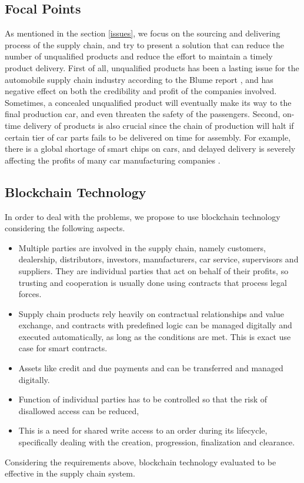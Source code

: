 \documentclass[12pt]{article}
\begin{document}
\subsection{Focal Points}
As mentioned in the section \ref{issues}, we focus on the sourcing and delivering process of the supply chain, 
and try to present a solution that can reduce the number of unqualified products and reduce the effort to maintain 
a timely product delivery. First of all, unqualified products has been a lasting issue for the automobile supply 
chain industry according to the Blume report \cite{blume}, and has negative effect on both the credibility and 
profit of the companies involved. Sometimes, a concealed unqualified product will eventually make its way to the 
final production car, and even threaten the safety of the passengers. Second, on-time delivery of products is also 
crucial since the chain of production will halt if certain tier of car parts fails to be delivered on time for assembly. 
For example, there is a global shortage of smart chips on cars, and delayed delivery is severely affecting the profits of 
many car manufacturing companies \cite{shortage}.

\subsection{Blockchain Technology}
In order to deal with the problems, we propose to use blockchain technology considering the following aspects.
\begin{itemize}
    \item Multiple parties are involved in the supply chain, namely customers, dealership, distributors, investors, manufacturers, car service, supervisors and suppliers. They are individual parties that act on behalf of their profits, so trusting and cooperation is usually done using contracts that process legal forces.
    \item Supply chain products rely heavily on contractual relationships and value exchange, and contracts with predefined logic can be managed digitally and executed automatically, as long as the conditions are met. This is exact use case for smart contracts.
    \item Assets like credit and due payments and can be transferred and managed digitally.
    \item Function of individual parties has to be controlled so that the risk of disallowed access can be reduced,
    \item This is a need for shared write access to an order during its lifecycle, specifically dealing with the creation, progression, finalization and clearance.
\end{itemize}
Considering the requirements above, blockchain technology evaluated to be effective in the supply chain system.
\end{document}
